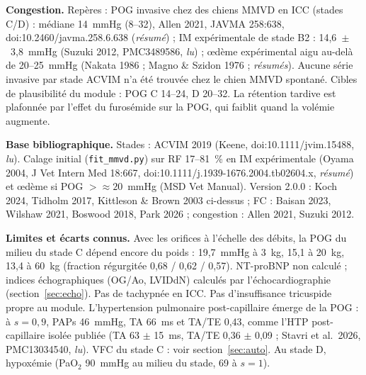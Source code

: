 \documentclass[10pt,a4paper]{article}
\newcommand{\cmd}[1]{\texttt{#1}}
\newcommand{\acc}[1]{\textsl{#1}}
\newcommand{\limite}[1]{\par\textbf{Limites et écarts connus.} #1}
\newcommand{\sources}[1]{\par\textbf{Base bibliographique.} #1}
\begin{document}
\textbf{Congestion.} Repères : POG invasive chez des chiens MMVD en ICC (stades C/D) : médiane 14~mmHg (8--32), Allen 2021, JAVMA 258:638, doi:10.2460/javma.258.6.638 (\acc{résumé}) ; IM expérimentale de stade B2 : 14,6~$\pm$~3,8~mmHg (Suzuki 2012, PMC3489586, \acc{lu}) ; œdème expérimental aigu au-delà de 20--25~mmHg (Nakata 1986 ; Magno \& Szidon 1976 ; \acc{résumés}). Aucune série invasive par stade ACVIM n'a été trouvée chez le chien MMVD spontané. Cibles de plausibilité du module : POG C 14--24, D 20--32. La rétention tardive est plafonnée par l'effet du furosémide sur la POG, qui faiblit quand la volémie augmente.

\sources{Stades : ACVIM 2019 (Keene, doi:10.1111/jvim.15488, \acc{lu}). Calage initial (\cmd{fit\_mmvd.py}) sur RF 17--81~\% en IM expérimentale (Oyama 2004, J Vet Intern Med 18:667, doi:10.1111/j.1939-1676.2004.tb02604.x, \acc{résumé}) et œdème si POG $> \approx 20$~mmHg (MSD Vet Manual). Version 2.0.0 : Koch 2024, Tidholm 2017, Kittleson \& Brown 2003 ci-dessus ; FC : Baisan 2023, Wilshaw 2021, Boswood 2018, Park 2026 ; congestion : Allen 2021, Suzuki 2012.}
\limite{Avec les orifices à l'échelle des débits, la POG du milieu du stade C dépend encore du poids : 19,7~mmHg à 3~kg, 15,1 à 20~kg, 13,4 à 60~kg (fraction régurgitée 0,68 / 0,62 / 0,57). NT-proBNP non calculé ; indices échographiques (OG/Ao, LVIDdN) calculés par l'échocardiographie (section~\ref{sec:echo}). Pas de tachypnée en ICC. Pas d'insuffisance tricuspide propre au module. L'hypertension pulmonaire post-capillaire émerge de la POG : à $s = 0{,}9$, PAPs 46~mmHg, TA 66~ms et TA/TE 0,43, comme l'HTP post-capillaire isolée publiée (TA 63 $\pm$ 15~ms, TA/TE 0,36 $\pm$ 0,09 ; Stavri et al.\ 2026, PMC13034540, \acc{lu}). VFC du stade C : voir section~\ref{sec:auto}. Au stade D, hypoxémie (PaO$_2$ 90~mmHg au milieu du stade, 69 à $s = 1$).}
\end{document}
